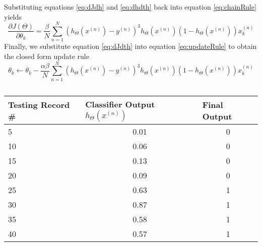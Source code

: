 \documentclass [11pt]{article}
\begin{document}
Substituting equations \ref{eq:dJdh} and \ref{eq:dhdth} back into equation \ref{eq:chainRule} yields
\begin{equation}\label{eq:dJdth}
\frac{\partial J(\Theta)}{\partial \theta_{k}} = \frac{\beta}{N}\sum_{n=1}^{N}(h_{\Theta}(x^{(n)})-y^{(n)})^{3}h_{\Theta}(x^{(n)})(1-h_{\Theta}(x^{(n)}))x_{k}^{(n)}
\end{equation}
Finally, we substitute equation \ref{eq:dJdth} into equation \ref{eq:updateRule} to obtain the closed form update rule
\begin{equation*}
\theta_{k} \gets \theta_{k} - \frac{\alpha \beta}{N}\sum_{n=1}^{N}(h_{\Theta}(x^{(n)})-y^{(n)})^{3}h_{\Theta}(x^{(n)})(1-h_{\Theta}(x^{(n)}))x_{k}^{(n)}
\end{equation*}
\subsection{}
\begin{table}[H]
\begin{tabular}{|l|c|c|}
\hline
\textbf{Testing Record \#} & \multicolumn{1}{l|}{\textbf{Classifier Output $h_{\Theta}(x^{(n)})$}} & \multicolumn{1}{l|}{\textbf{Final Output}} \\ \hline
5                          & 0.01                                            & 0                                          \\ \hline
10                         & 0.06                                            & 0                                          \\ \hline
15                         & 0.13                                            & 0                                          \\ \hline
20                         & 0.09                                            & 0                                          \\ \hline
25                         & 0.63                                            & 1                                          \\ \hline
30                         & 0.87                                            & 1                                          \\ \hline
35                         & 0.58                                            & 1                                          \\ \hline
40                         & 0.57                                            & 1                                          \\ \hline
\end{tabular}
\end{table}
\end{document}
